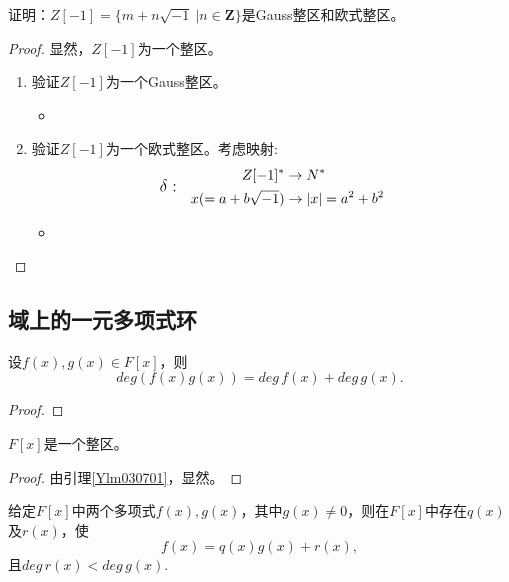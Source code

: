 \begin{example}
	证明：$Z[-1]=\{m+n\sqrt{-1}\ \big| n\in \mathbf{Z}\}$是Gauss整区和欧式整区。
\end{example}

\begin{proof}
	显然，$Z[-1]$为一个整区。
	\begin{enumerate}
		\item 验证$Z[-1]$为一个Gauss整区。
		\begin{itemize}
			\item 
		\end{itemize}
		\item 验证$Z[-1]$为一个欧式整区。考虑映射:
		\begin{equation*}
		\text{\large $\delta:$}\quad
		\begin{aligned}
			Z[-1]^{*} &\rightarrow N^{*}\\
			x(=a+b\sqrt{-1}) &\rightarrow |x|=a^{2}+b^{2} 
		\end{aligned}
		\end{equation*}
		\begin{itemize}
			\item 
		\end{itemize}
	\end{enumerate}
	
		
\end{proof}

\subsection{域上的一元多项式环}
\begin{lemma}\label{Ylm030701}
	设$f(x),g(x)\in F[x]$，则
	\begin{equation*}
		deg(f(x)g(x))=deg \, f(x) +deg \, g(x).
	\end{equation*}
\end{lemma}

\begin{proof}
	
\end{proof}

\begin{corollary}
	$F[x]$是一个整区。
\end{corollary}

\begin{proof}
	由引理\ref{Ylm030701}，显然。
\end{proof}

\begin{lemma}\label{Ylm030702}
	给定$F[x]$中两个多项式$f(x),g(x)$，其中$g(x)\neq 0$，则在$F[x]$中存在$q(x)$及$r(x)$，使
	\begin{equation*}
			f(x)=q(x)g(x)+r(x),
	\end{equation*}
	且\hspace{\fill}$deg \, r(x)< deg \, g(x).$\hspace{\fill}{}
\end{lemma}

